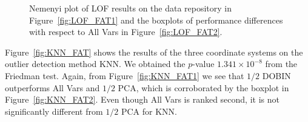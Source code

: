 \documentclass[letter,12pt]{article}
\begin{document}
\begin{figure}[!ht]
	\centering
	\hfill
	\caption{Nemenyi plot of LOF results on the data repository in Figure~\ref{fig:LOF_FAT1} and the boxplots of performance differences with respect to All Vars in Figure~\ref{fig:LOF_FAT2}.}
	\label{fig:LOF_FAT}
\end{figure}

Figure~\ref{fig:KNN_FAT} shows the results of the three coordinate systems on the outlier detection method KNN. We obtained the $p$-value $1.341\times 10^{-8}$ from the Friedman test. Again, from Figure~\ref{fig:KNN_FAT1} we see that $1/2$ DOBIN outperforms All Vars and $1/2$ PCA, which is corroborated by the boxplot in Figure~\ref{fig:KNN_FAT2}. Even though All Vars is ranked second, it is not significantly different from $1/2$ PCA for KNN.
\end{document}
